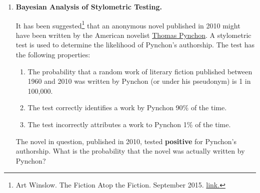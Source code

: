 \documentclass[12pt]{article}
\newif\ifsolutions
\begin{document}
\begin{enumerate}
    \item \textbf{Bayesian Analysis of Stylometric Testing.}    
    
    It has been suggested\footnote{Art Winslow. The Fiction Atop the Fiction. September 2015. \href{http://harpers.org/2015/09/the-fiction-atop-the-fiction/}{link.}} that an anonymous novel published in 2010 might have been written by the American novelist \href{https://en.wikipedia.org/wiki/Thomas_Pynchon}{Thomas Pynchon}. A stylometric test is used to determine the likelihood of Pynchon's authorship. The test has the following properties:
    \begin{enumerate}[label=(\alph*)]
        \item The probability that a random work of literary fiction published between 1960 and 2010 was written by Pynchon (or under his pseudonym) is 1 in 100,000.
        \item The test correctly identifies a work by Pynchon 90\% of the time.
        \item The test incorrectly attributes a work to Pynchon 1\% of the time.
    \end{enumerate}
    The novel in question, published in 2010, tested \textbf{positive} for Pynchon's authorship. What is the probability that the novel was actually written by Pynchon?
    \vspace{0.2cm}
    
    \ifsolutions \color{blue} \textbf{Solution:} \\
    Define the events
    \begin{align*}
        P &= \text{ a work of literary fiction between 1960 and 2010 is written by Pynchon}, \\
        T &= \text{ the test identifies a work of literary fiction as written by Pynchon}.
    \end{align*}
    We get the following from the problem's data,
    \begin{align*}
        (a) &\Longrightarrow P(P) = 0.00001 \\
        (b) &\Longrightarrow P(T | P) = 0.9 \quad (\text{sensitivity of the test}) \\
        (c) &\Longrightarrow P(T | P^c) = 0.01 \quad (\text{false-positive rate}) 
    \end{align*}
    By Bayes' theorem, the probability that the novel was written by Pynchon given that the test was positive is:
    \begin{align*}
        P(P | T) 
        &= \frac{P(T | P) P(P)}{P(T | P) P(P) + P(T | P^c) P(P^c)} \\
        &=  \frac{0.9 \times 0.00001}{(0.9 \times 0.00001) + (0.01 \times 0.99999)} \\
        &\approx 0.0009 \text{ (rounded to 4 decimal places)}
    \end{align*}
    Therefore, the probability that the novel was actually written by Pynchon given that the test was positive is approximately \( 0.0009 \) or \( 0.09\% \).
    \fi \color{black}


\end{enumerate}
\end{document}
